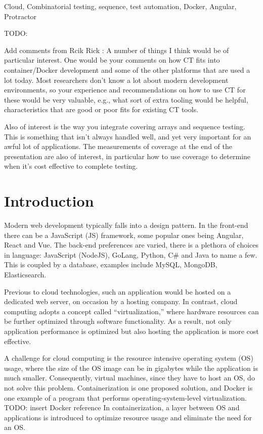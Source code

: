 \documentclass[conference]{IEEEtran}
\newcommand{\todo}[1]{}
\renewcommand{\todo}[1]{{\color{red} TODO: {#1}}}
\begin{document}
\begin{IEEEkeywords}
Cloud, Combinatorial testing, sequence, test automation, Docker, Angular, Protractor
\end{IEEEkeywords}

\todo{ Add comments from Rcik 
Rick : A number of things I think would be of particular interest. 
One would be your comments on how CT fits into container/Docker development and some of the other platforms that are used a lot today. 
Most researchers don’t know a lot about modern development environments, so your experience and recommendations on how to use CT for these would be very valuable, e.g., 
what sort of extra tooling would be helpful, characteristics that are good or poor fits for existing CT tools.

Also of interest is the way you integrate covering arrays and sequence testing.
This is something that isn’t always handled well, and yet very important for an awful lot of applications.
The measurements of coverage at the end of the presentation are also of interest,
in particular how to use coverage to determine when it’s cost effective to complete testing.
}


\section{Introduction}
Modern web development typically falls into a design pattern. In the front-end there can be a JavaScript (JS) framework, some popular ones being Angular, React and Vue.
The back-end preferences are varied, there is a plethora of choices in language: JavaScript (NodeJS), GoLang, Python, C\# and Java to name a few. 
This is coupled by a database, examples include MySQL, MongoDB, Elasticsearch.

Previous to cloud technologies, such an application would be hosted on a dedicated web server, on occasion by a hosting company.
In contrast, cloud computing adopts a concept called “virtualization,” where hardware resources can be further optimized through software functionality.
As a result, not only application performance is optimized but also hosting the application is more cost effective.

A challenge for cloud computing is the resource intensive operating system (OS) usage, where the size of the OS image can be in gigabytes while the application is much smaller. 
Consequently, virtual machines, since they have to host an OS, do not solve this problem.
Containerization is one proposed solution, and Docker is one example of a program that performs operating-system-level virtualization. 
\todo {insert Docker reference}
In containerization, a layer between OS and applications is introduced to optimize resource usage and eliminate the need for an OS.
\end{document}
